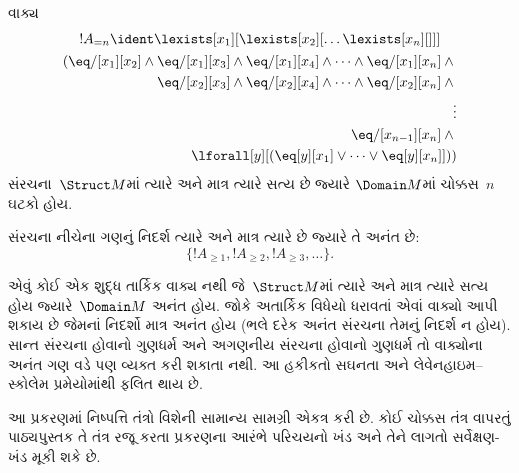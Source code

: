 \begin{prop}
વાક્ય
\begin{multline*}
!A_{= n} \ident \lexists[x_1][\lexists[x_2][\dots\lexists[x_n][{}]]] \\
\begin{aligned}
  (\eq/[x_1][x_2] \land {}
  \eq/[x_1][x_3] \land \eq/[x_1][x_4] \land \dots \land \eq/[x_1][x_n] \land {}\\
\eq/[x_2][x_3] \land \eq/[x_2][x_4] \land \dots \land {} \eq/[x_2][x_n] \land {} \\
\vdots\\
\eq/[x_{n-1}][x_n] \land {} \\
\lforall[y][(\eq[y][x_1] \lor \dots \lor \eq[y][x_n]]))
\end{aligned}
\end{multline*}
સંરચના~$\Struct M$માં ત્યારે અને માત્ર ત્યારે સત્ય છે જ્યારે
$\Domain M$માં ચોક્કસ~$n$ ઘટકો હોય.
\end{prop}

\begin{prop}
સંરચના નીચેના ગણનું નિદર્શ ત્યારે અને માત્ર ત્યારે છે જ્યારે
તે અનંત છે:
\[
\{!A_{\ge 1}, !A_{\ge 2}, !A_{\ge 3}, \dots \}.
\]
\end{prop}

એવું કોઈ એક શુદ્ધ તાર્કિક વાક્ય નથી જે~$\Struct M$માં ત્યારે અને માત્ર
ત્યારે સત્ય હોય જ્યારે~$\Domain M$ અનંત હોય. જોકે અતાર્કિક
વિધેયો ધરાવતાં એવાં વાક્યો આપી શકાય છે જેમનાં નિદર્શો
માત્ર અનંત હોય (ભલે દરેક અનંત સંરચના તેમનું નિદર્શ ન હોય).
સાન્ત સંરચના હોવાનો ગુણધર્મ અને અગણનીય સંરચના હોવાનો ગુણધર્મ તો
વાક્યોના અનંત ગણ વડે પણ વ્યક્ત કરી શકાતા નથી. આ હકીકતો સઘનતા
અને લેવેનહાઇમ--સ્કોલેમ પ્રમેયોમાંથી ફલિત થાય છે.
\endgroup


\OLEndChapterHook
\endgroup


\begingroup
\makeatletter{}\makeatother

\label{guunit:OLP-0063}

\begin{editorial}
આ પ્રકરણમાં નિષ્પત્તિ તંત્રો વિશેની સામાન્ય સામગ્રી એકત્ર કરી છે.
કોઈ ચોક્કસ તંત્ર વાપરતું પાઠ્યપુસ્તક તે તંત્ર રજૂ કરતા પ્રકરણના આરંભે
પરિચયનો ખંડ અને તેને લાગતો સર્વેક્ષણ-ખંડ મૂકી શકે છે.
\end{editorial}

\begingroup
\makeatletter{}\makeatother


